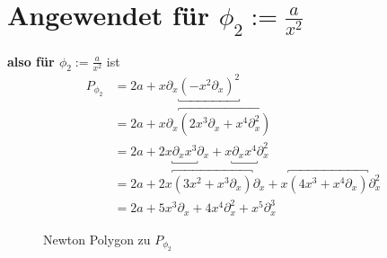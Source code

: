 \section{Angewendet für $\phi_2:=\frac{a}{x^2}$}
\begin{comment}
für $q=2$
%
\begin{align*}
P_{\phi}(x,\partial_x) &=(-x^2\partial_x)^2 (x\partial_x-1)+2a \\
  &=x^2\underbracket{\partial_xx^2}\partial_x(x\partial_x-1)+2a \\
  &=x^2\overbracket{(x^2\partial_x+2x)}\partial_x(x\partial_x-1)+2a \\
  &=(x^4\partial_x^2+2x^3\partial_x)(x\partial_x-1)+2a \\
  &=x^4\underbracket{\partial_x^2x}\partial_x
    +2x^3\underbracket{\partial_xx}\partial_x
    -x^4\partial_x^2-2x^3\partial_x+2a \\
  &=x^4\overbracket{(x\partial_x^2+2x)}\partial_x
    +2x^3\overbracket{(x\partial_x+1)}\partial_x
    -x^4\partial_x^2-2x^3\partial_x+2a \\
  &=x^5\partial_x^3+2x^5\partial_x +2x^4\partial_x^2 +2x^3\partial_x
    -x^4\partial_x^2-2x^3\partial_x+2a \\
  &=3x^5\partial_x^3 +x^4\partial_x^2 + 2a
\end{align*}
\end{comment}

\textbf{also für $\phi_2:=\frac{a}{x^2}$} ist
\begin{align*}
P_{\phi_2} &=2a+x\partial_x\underbracket{(-x^2\partial_x)^{2}}\\
           &=2a +x\partial_x \overbracket{(2x^3\partial_x+x^4\partial_x^2)} \\
           &=2a
             +2x\underbracket{\partial_xx^3}\partial_x
             +x\underbracket{\partial_xx^4}\partial_x^2 \\
           &=2a
             +2x\overbracket{(3x^2+x^3\partial_x)}\partial_x
             +x\overbracket{(4x^3+x^4\partial_x)}\partial_x^2 \\
           &=2a+5x^3\partial_x+4x^{4}\partial_x^2+x^5\partial_x^3
\end{align*}
\begin{figure}[H]
\caption{Newton Polygon zu $P_{\phi_2}$}
\begin{center}
\end{center}
\end{figure}

